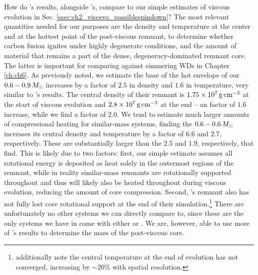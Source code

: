 How do \cite{ji+13}'s results, alongside \cite{schw+12}'s, compare to our simple estimates of viscous evolution in Sec. \ref{ssec:ch2_viscevo_possiblespindown}?  The most relevant quantities needed for our purposes are the density and temperature at the center and at the hottest point of the post-viscous remnant, to determine whether carbon fusion ignites under highly degenerate conditions, and the amount of material that remains a part of the dense, degeneracy-dominated remnant core.  The latter is important for comparing against simmering WDs in Chapter \ref{ch:ch6}.  As previously noted, we estimate the base of the hot envelope of our $0.6-0.9\,\Msun$ increases by a factor of $2.5$ in density and $1.6$ in temperature, very similar to \cite{schw+12}'s results.  The central density of their remnant is $1.75\times10^7\,\gcc$ at the start of viscous evolution \citep{dan+11} and $2.8\times10^7\,\gcc$ at the end -- an factor of $1.6$ increase, while we find a factor of $2.0$.  We tend to estimate much larger amounts of compressional heating for similar-mass systems, finding the $0.6 - 0.6\,\Msun$ increases its central density and temperature by a factor of $6.6$ and $2.7$, respectively.  These are substantially larger than the $2.5$ and $1.9$, respectively, that \cite{ji+13} find.  This is likely due to two factors: first, our simple estimate assumes all rotational energy is deposited as heat solely in the outermost regions of the remnant, while in reality similar-mass remnants are rotationally supported throughout and thus will likely also be heated throughout during viscous evolution, reducing the amount of core compression.  Second, \cite{ji+13}'s remnant also has not fully lost core rotational support at the end of their simulation.\footnote{\cite{ji+13} additionally note the central temperature at the end of evolution has not converged, increasing by $\sim20$\% with spatial resolution.}  There are unfortunately no other systems we can directly compare to, since these are the only systems we have in come with either \cite{schw+12} or \cite{ji+13}.  We are, however, able to use more of \cite{schw+12}'s results to determine the mass of the post-viscous core. 


